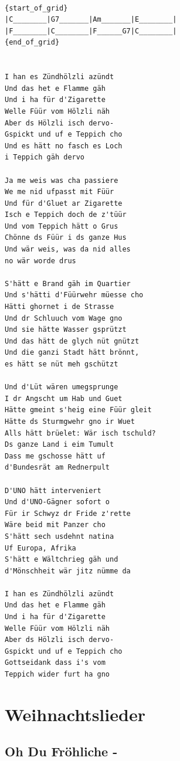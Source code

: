 \documentclass[
]{book}
\let\stdsection\section
\renewcommand\section{\clearpage\stdsection}
\begin{document}
\begin{verbatim}

{start_of_grid}
|C________|G7_______|Am_______|E________|
|F________|C________|F______G7|C________|
{end_of_grid}


I han es Zündhölzli azündt
Und das het e Flamme gäh
Und i ha für d'Zigarette
Welle Füür vom Hölzli näh
Aber ds Hölzli isch dervo-
Gspickt und uf e Teppich cho
Und es hätt no fasch es Loch 
i Teppich gäh dervo

Ja me weis was cha passiere
We me nid ufpasst mit Füür
Und für d'Gluet ar Zigarette
Isch e Teppich doch de z'tüür
Und vom Teppich hätt o Grus
Chönne ds Füür i ds ganze Hus
Und wär weis, was da nid alles 
no wär worde drus

S'hätt e Brand gäh im Quartier
Und s'hätti d'Füürwehr müesse cho
Hätti ghornet i de Strasse
Und dr Schluuch vom Wage gno
Und sie hätte Wasser gsprützt
Und das hätt de glych nüt gnützt
Und die ganzi Stadt hätt brönnt, 
es hätt se nüt meh gschützt

Und d'Lüt wären umegsprunge
I dr Angscht um Hab und Guet
Hätte gmeint s'heig eine Füür gleit
Hätte ds Sturmgwehr gno ir Wuet
Alls hätt brüelet: Wär isch tschuld?
Ds ganze Land i eim Tumult
Dass me gschosse hätt uf 
d'Bundesrät am Rednerpult

D'UNO hätt interveniert
Und d'UNO-Gägner sofort o
Für ir Schwyz dr Fride z'rette
Wäre beid mit Panzer cho
S'hätt sech usdehnt natina
Uf Europa, Afrika
S'hätt e Wältchrieg gäh und 
d'Mönschheit wär jitz nümme da

I han es Zündhölzli azündt
Und das het e Flamme gäh
Und i ha für d'Zigarette
Welle Füür vom Hölzli näh
Aber ds Hölzli isch dervo-
Gspickt und uf e Teppich cho 
Gottseidank dass i's vom 
Teppich wider furt ha gno
\end{verbatim}

\hypertarget{weihnachtslieder}{%
\chapter{Weihnachtslieder}\label{weihnachtslieder}}

\hypertarget{oh-du-fruxf6hliche--}{%
\section{Oh Du Fröhliche -}\label{oh-du-fruxf6hliche--}}
\end{document}
